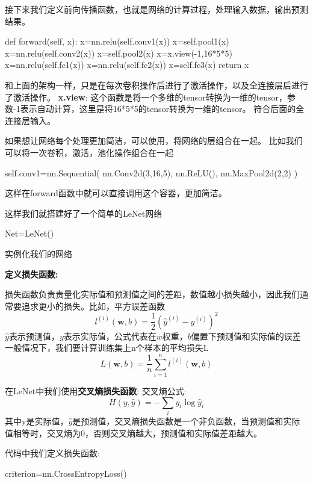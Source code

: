 接下来我们定义前向传播函数，也就是网络的计算过程，处理输入数据，输出预测结果。
\begin{tpython}
    def forward(self, x):
        x=nn.relu(self.conv1(x))
        x=self.pool1(x)
        x=nn.relu(self.conv2(x))
        x=self.pool2(x)
        x=x.view(-1,16*5*5)
        x=nn.relu(self.fc1(x))
        x=nn.relu(self.fc2(x))
        x=self.fc3(x)
        return x
\end{tpython}
和上面的架构一样，只是在每次卷积操作后进行了激活操作，以及全连接层后进行了激活操作。
\textbf{x.view}:
这个函数是将一个多维的tensor转换为一维的tensor，参数-1表示自动计算，这里是将16*5*5的tensor转换为一维的tensor。
符合后面的全连接层输入。

如果想让网络每个处理更加简洁，可以使用，将网络的层组合在一起。
比如我们可以将一次卷积，激活，池化操作组合在一起
\begin{tpython}
    self.conv1=nn.Sequential(
        nn.Conv2d(3,16,5),
        nn.ReLU(),
        nn.MaxPool2d(2,2)
    )
\end{tpython}
这样在forward函数中就可以直接调用这个容器，更加简洁。

这样我们就搭建好了一个简单的LeNet网络
\begin{tpython}
    Net=LeNet() 
\end{tpython}
实例化我们的网络

\textbf{定义损失函数:}

损失函数负责责量化实际值和预测值之间的差距，数值越小损失越小，因此我们通常要追求更小的损失。比如，平方误差函数
\begin{equation}
    l^{(i)}(\textbf{w},b)=\frac{1}{2}(\hat{y}^{(i)}-y^{(i)})^{2}
\end{equation}
$\hat{y}$表示预测值，$y$表示实际值，公式代表在$w$权重，$b$偏置下预测值和实际值的误差
一般情况下，我们要计算训练集上n个样本的平均损失L
\begin{equation}
    L(\textbf{w},b)=\frac{1}{n}\sum_{i=1}^{n}l^{(i)}(\textbf{w},b)
\end{equation}

在LeNet中我们使用\textbf{交叉熵损失函数}:
交叉熵公式:
\begin{equation}
    H(y,\hat{y})=-\sum_{i}y_{i}\log{\hat{y}_{i}}
\end{equation}
其中y是实际值，$\hat{y}$是预测值，交叉熵损失函数是一个非负函数，当预测值和实际值相等时，交叉熵为0，否则交叉熵越大，预测值和实际值差距越大。

代码中我们定义损失函数:
\begin{tpython}
    criterion=nn.CrossEntropyLoss()
\end{tpython}

